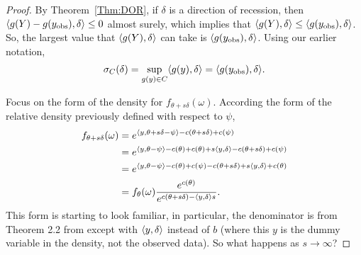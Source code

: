 \begin{proof}
By Theorem~\ref{Thm:DOR}, if $\delta$ is a direction of recession, then 
$\langle g(Y) - g(y_{\textrm{obs}}), \delta \rangle \leq 0$ almost surely, which implies 
that $\langle g(Y), \delta \rangle \leq \langle g(y_{\textrm{obs}}), \delta \rangle$.  
So, the largest value that $\langle g(Y), \delta \rangle$ can take is 
$\langle g(y_{\textrm{obs}}), \delta \rangle$.  Using our earlier notation, 
\begin{align*}
\sigma_C(\delta) = \sup_{g(y) \in C}\langle g(y), \delta \rangle = 
\langle g(y_{\textrm{obs}}), \delta \rangle.
\end{align*}

Focus on the form of the density for $f_{\theta+s\delta}(\omega)$.  According the 
form of the relative density previously defined with respect to $\psi$,
\begin{align*}
 f_{\theta+s\delta}(\omega) &= e^{ \langle y,\theta+s\delta - \psi \rangle - c(\theta+s
\delta) + c(\psi)  } \\
 	&= e^{ \langle y,\theta - \psi \rangle -c(\theta) + c(\theta) + s \langle y,\delta \rangle - c
(\theta+s\delta) + c(\psi)  } \\
 	&= e^{ \langle y,\theta - \psi \rangle -c(\theta) + c(\psi) - c(\theta+s\delta) + s 
\langle y,\delta \rangle + c(\theta)   } \\
 	&= f_\theta(\omega) \frac{e^{c(\theta)}}{e^{ c(\theta+s\delta) - \langle y,\delta \rangle
s } }.
\end{align*}
This form is starting to look familiar, in particular, the denominator is from 
Theorem 2.2 from \citet{Geyer:1990} except with $\langle y,\delta \rangle$ instead of $b$ 
(where this 
$y$ is the dummy variable in the density, not the observed data).  So what happens as 
$s \to \infty$?  


\end{proof}
